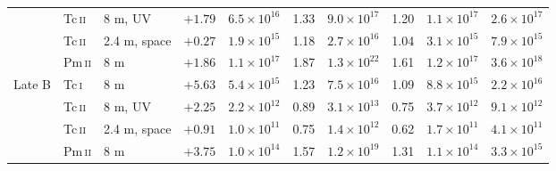 \begin{tabular}{lllrrrrrrr}
 & Tc\,\textsc{ii} & 8 m, UV & $+1.79$ & $6.5\times10^{16}$ & 1.33 & $9.0\times10^{17}$ & 1.20 & $1.1\times10^{17}$ & $2.6\times10^{17}$ \\
 & Tc\,\textsc{ii} & 2.4 m, space & $+0.27$ & $1.9\times10^{15}$ & 1.18 & $2.7\times10^{16}$ & 1.04 & $3.1\times10^{15}$ & $7.9\times10^{15}$ \\
 & Pm\,\textsc{ii} & 8 m & $+1.86$ & $1.1\times10^{17}$ & 1.87 & $1.3\times10^{22}$ & 1.61 & $1.2\times10^{17}$ & $3.6\times10^{18}$ \\
\addlinespace
Late B & Tc\,\textsc{i} & 8 m & $+5.63$ & $5.4\times10^{15}$ & 1.23 & $7.5\times10^{16}$ & 1.09 & $8.8\times10^{15}$ & $2.2\times10^{16}$ \\
 & Tc\,\textsc{ii} & 8 m, UV & $+2.25$ & $2.2\times10^{12}$ & 0.89 & $3.1\times10^{13}$ & 0.75 & $3.7\times10^{12}$ & $9.1\times10^{12}$ \\
 & Tc\,\textsc{ii} & 2.4 m, space & $+0.91$ & $1.0\times10^{11}$ & 0.75 & $1.4\times10^{12}$ & 0.62 & $1.7\times10^{11}$ & $4.1\times10^{11}$ \\
 & Pm\,\textsc{ii} & 8 m & $+3.75$ & $1.0\times10^{14}$ & 1.57 & $1.2\times10^{19}$ & 1.31 & $1.1\times10^{14}$ & $3.3\times10^{15}$ \\
\bottomrule
\end{tabular}

